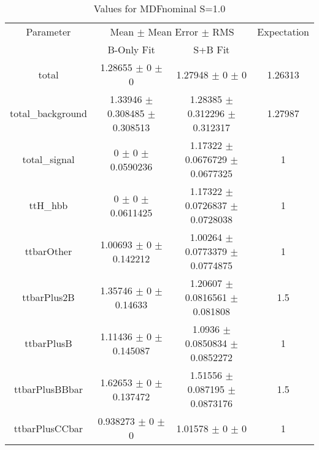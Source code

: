 \begin{table}
\centering
\caption{Values for MDFnominal S=1.0}
\begin{tabular}{cccc}
\toprule
Parameter & \multicolumn{2}{c}{Mean $\pm$ Mean Error $\pm$ RMS} & Expectation\\
 & B-Only Fit & S+B Fit & \\
\midrule
total & \num{1.28655} $\pm$ \num{0} $\pm$ \num{0} & \num{1.27948} $\pm$ \num{0} $\pm$ \num{0} & \num{1.26313}\\
total\_background & \num{1.33946} $\pm$ \num{0.308485} $\pm$ \num{0.308513} & \num{1.28385} $\pm$ \num{0.312296} $\pm$ \num{0.312317} & \num{1.27987}\\
total\_signal & \num{0} $\pm$ \num{0} $\pm$ \num{0.0590236} & \num{1.17322} $\pm$ \num{0.0676729} $\pm$ \num{0.0677325} & \num{1}\\
ttH\_hbb & \num{0} $\pm$ \num{0} $\pm$ \num{0.0611425} & \num{1.17322} $\pm$ \num{0.0726837} $\pm$ \num{0.0728038} & \num{1}\\
ttbarOther & \num{1.00693} $\pm$ \num{0} $\pm$ \num{0.142212} & \num{1.00264} $\pm$ \num{0.0773379} $\pm$ \num{0.0774875} & \num{1}\\
ttbarPlus2B & \num{1.35746} $\pm$ \num{0} $\pm$ \num{0.14633} & \num{1.20607} $\pm$ \num{0.0816561} $\pm$ \num{0.081808} & \num{1.5}\\
ttbarPlusB & \num{1.11436} $\pm$ \num{0} $\pm$ \num{0.145087} & \num{1.0936} $\pm$ \num{0.0850834} $\pm$ \num{0.0852272} & \num{1}\\
ttbarPlusBBbar & \num{1.62653} $\pm$ \num{0} $\pm$ \num{0.137472} & \num{1.51556} $\pm$ \num{0.087195} $\pm$ \num{0.0873176} & \num{1.5}\\
ttbarPlusCCbar & \num{0.938273} $\pm$ \num{0} $\pm$ \num{0} & \num{1.01578} $\pm$ \num{0} $\pm$ \num{0} & \num{1}\\
\bottomrule
\end{tabular}
\end{table}